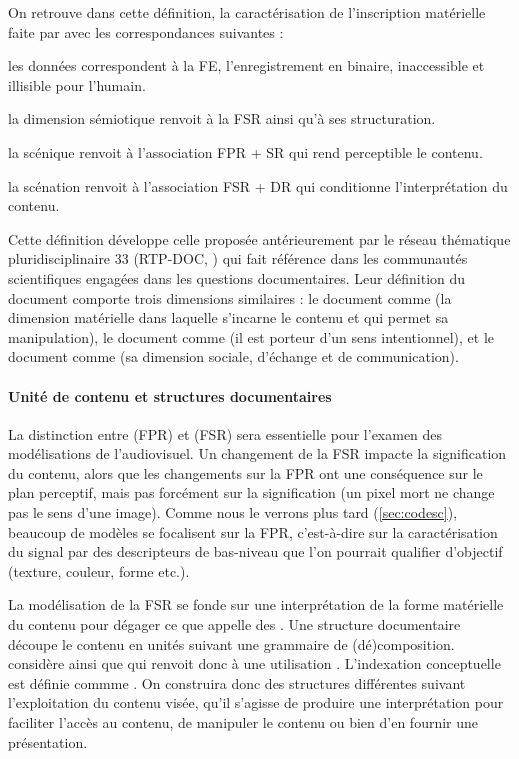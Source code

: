 On retrouve dans cette définition, la caractérisation de l'inscription matérielle faite par \cite{bachimont:icc} avec les correspondances suivantes : 
\begin{liste}
	\item les données correspondent à la FE, l'enregistrement en binaire, inaccessible et illisible pour l'humain. 
	\item la dimension sémiotique renvoit à la FSR ainsi qu'à ses structuration.
	\item la scénique renvoit à l'association FPR + SR qui rend perceptible le contenu.
	\item la scénation renvoit à l'association FSR + DR qui conditionne l'interprétation du contenu.
\end{liste}

Cette définition développe celle proposée antérieurement par le réseau thématique pluridisciplinaire 33 (RTP-DOC, \cite{Pedauque2003}) qui fait référence dans les communautés scientifiques engagées dans les questions documentaires.
Leur définition du document comporte trois dimensions similaires : le document comme  (la dimension matérielle dans laquelle s’incarne le contenu et qui permet sa manipulation), le document comme  (il est porteur d’un sens intentionnel), et le document comme  (sa dimension sociale, d'échange et de communication).

 


\paragraph{Unité de contenu et structures documentaires}
La distinction entre  (FPR) et  (FSR) sera essentielle pour l'examen des modélisations de l'audiovisuel.
Un changement de la FSR impacte la signification du contenu, alors que les changements sur la FPR ont une conséquence sur le plan perceptif, mais pas forcément sur la signification (un pixel mort ne change pas le sens d'une image).
Comme nous le verrons plus tard (\ref{sec:codesc}), beaucoup de modèles se focalisent sur la FPR, c'est-à-dire sur la caractérisation du signal par des descripteurs de bas-niveau que l'on pourrait qualifier d'objectif (texture, couleur, forme etc.).

La modélisation de la FSR se fonde sur une interprétation de la forme matérielle du contenu pour dégager ce que \cite{Prie2000} appelle des .
Une structure documentaire découpe le contenu en unités suivant une grammaire de (dé)composition.
\citeauthor{Prie2000} considère ainsi que  qui renvoit donc à une utilisation .
L'indexation conceptuelle est définie commme .
On construira donc des structures différentes suivant l'exploitation du contenu visée, qu'il s'agisse de produire une interprétation pour faciliter l'accès au contenu, de manipuler le contenu ou bien d'en fournir une présentation. 

